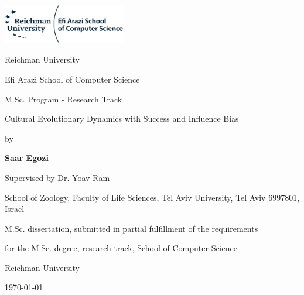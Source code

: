 \documentclass[12pt]{extarticle}
\begin{document}
\begin{titlepage}
	\centering
	\includegraphics[width=0.4\textwidth]{ReichmanLogo}\par\vspace{1cm}
	{\huge Reichman University \par}
	{\Large Efi Arazi School of Computer Science \par}
	{\Large M.Sc. Program - Research Track \par}

	\vspace{1.5cm}
	{\Huge Cultural Evolutionary Dynamics with Success and Influence Bias\par}
	\vspace{1.5cm}
	{\large by\par}
	{\Large\bfseries Saar Egozi\par}
	\vspace{1cm}
	{\large Supervised by Dr. Yoav Ram\par}
	{School of Zoology, Faculty of Life Sciences, Tel Aviv University, Tel Aviv 6997801, Israel\par}

	\vspace{1cm}
	{M.Sc. dissertation, submitted in partial fulfillment of the requirements\par}
	{for the M.Sc. degree, research track, School of Computer Science\par}
	{Reichman University}

	\vspace{1cm}
	{\large \today \par}

\end{titlepage}



 
\end{document}
